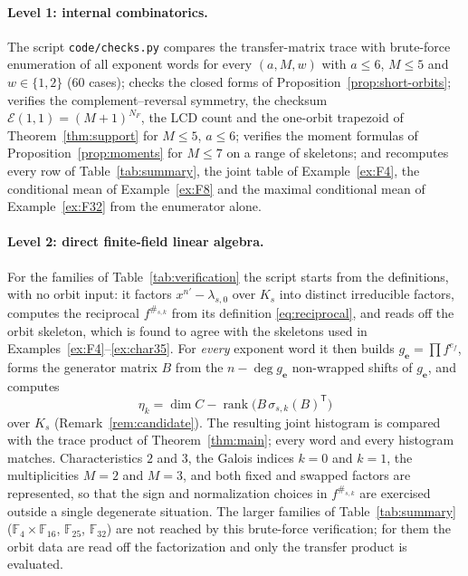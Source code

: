 \documentclass[11pt,a4paper]{article}
\newcommand{\F}{\mathbb F}
\newcommand{\Epoly}{\mathscr E}
\newcommand{\rank}{\operatorname{rank}}
\numberwithin{equation}{section}
\theoremstyle{plain}
\theoremstyle{definition}
\theoremstyle{remark}
\begin{document}
\paragraph{Level 1: internal combinatorics.}  The script
\texttt{code/checks.py} compares the transfer-matrix trace with brute-force
enumeration of all exponent words for every $(a,M,w)$ with $a\leq6$, $M\leq5$
and $w\in\{1,2\}$ (60 cases); checks the closed forms of
Proposition~\ref{prop:short-orbits}; verifies the complement--reversal symmetry,
the checksum $\Epoly(1,1)=(M+1)^{N_F}$, the LCD count and the one-orbit
trapezoid of Theorem~\ref{thm:support} for $M\leq5$, $a\leq6$; verifies the
moment formulas of Proposition~\ref{prop:moments} for $M\leq7$ on a range of
skeletons; and recomputes every row of Table~\ref{tab:summary}, the joint table
of Example~\ref{ex:F4}, the conditional mean of Example~\ref{ex:F8} and the
maximal conditional mean of Example~\ref{ex:F32} from the enumerator alone.

\paragraph{Level 2: direct finite-field linear algebra.}  For the families of
Table~\ref{tab:verification} the script starts from the definitions, with no
orbit input: it factors $x^{n'}-\lambda_{s,0}$ over $K_s$ into distinct
irreducible factors, computes the reciprocal $f^{\#_{s,k}}$ from its definition
\eqref{eq:reciprocal}, and reads off the orbit skeleton, which is found to agree
with the skeletons used in Examples~\ref{ex:F4}--\ref{ex:char35}.  For
\emph{every} exponent word it then builds $g_{\mathbf{e}}=\prod f^{e_f}$, forms
the generator matrix $B$ from the $n-\deg g_{\mathbf{e}}$ non-wrapped shifts of
$g_{\mathbf{e}}$, and computes
\[
\eta_k=\dim C-\rank\bigl(B\,\sigma_{s,k}(B)^{\mathsf T}\bigr)
\]
over $K_s$ (Remark~\ref{rem:candidate}).  The resulting joint histogram is
compared with the trace product of Theorem~\ref{thm:main}; every word and every
histogram matches.  Characteristics $2$ and $3$, the Galois indices $k=0$ and
$k=1$, the multiplicities $M=2$ and $M=3$, and both fixed and swapped factors
are represented, so that the sign and normalization choices in $f^{\#_{s,k}}$
are exercised outside a single degenerate situation.  The larger families of
Table~\ref{tab:summary} ($\F_4\times\F_{16}$, $\F_{25}$, $\F_{32}$) are not
reached by this brute-force verification; for them the orbit data are read off
the factorization and only the transfer product is evaluated.
\end{document}
